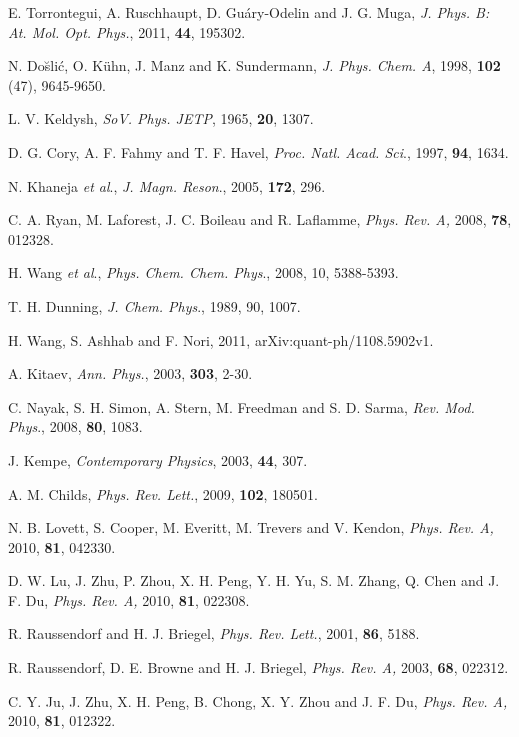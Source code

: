 \documentclass[8.5pt,twoside,twocolumn]{article}
\begin{document}
\begin{thebibliography}{99}
E. Torrontegui, A. Ruschhaupt, D. Gu\'{a}ry-Odelin and J. G. Muga, \emph{J. Phys. B: At. Mol. Opt. Phys.}, 2011, \textbf{44}, 195302.

N. Do\u{s}li\'{c}, O. K\"{u}hn, J. Manz and K. Sundermann, \emph{J. Phys. Chem. A}, 1998, \textbf{102} (47), 9645-9650.

L. V. Keldysh, \emph{SoV. Phys. JETP}, 1965, \textbf{20}, 1307.


D. G. Cory, A. F. Fahmy and T. F. Havel, \emph{Proc. Natl. Acad. Sci}., 1997, \textbf{94}, 1634.

N. Khaneja \emph{et al}., \emph{J. Magn. Reson}., 2005, \textbf{172}, 296.


C. A. Ryan, M. Laforest, J. C. Boileau and R. Laflamme, \emph{Phys. Rev. A,} 2008, \textbf{78}, 012328.

H. Wang \emph{et al}., \emph{Phys. Chem. Chem. Phys}., 2008, 10, 5388-5393.

 T. H. Dunning, \emph{J. Chem. Phys}., 1989, 90, 1007.

 H. Wang, S. Ashhab and F. Nori, 2011, arXiv:quant-ph/1108.5902v1.

A. Kitaev, \emph{Ann. Phys.}, 2003, \textbf{303}, 2-30.

C. Nayak, S. H. Simon, A. Stern, M. Freedman and S. D. Sarma, \emph{Rev. Mod. Phys}., 2008, \textbf{80}, 1083.

J. Kempe, \emph{Contemporary Physics}, 2003, \textbf{44}, 307.

 A. M. Childs, \emph{Phys. Rev. Lett.}, 2009, \textbf{102}, 180501.

N. B. Lovett, S. Cooper, M. Everitt, M. Trevers and V. Kendon, \emph{Phys. Rev. A,} 2010, \textbf{81}, 042330.

D. W. Lu, J. Zhu, P. Zhou, X. H. Peng, Y. H. Yu, S. M. Zhang, Q. Chen and J. F. Du, \emph{Phys. Rev. A,} 2010, \textbf{81}, 022308.

R. Raussendorf and H. J. Briegel, \emph{Phys. Rev. Lett.}, 2001, \textbf{86}, 5188.


R. Raussendorf, D. E. Browne and H. J. Briegel, \emph{Phys. Rev. A,} 2003, \textbf{68}, 022312.

 C. Y. Ju, J. Zhu, X. H. Peng, B. Chong, X. Y. Zhou and J. F. Du, \emph{Phys. Rev. A,} 2010, \textbf{81}, 012322.




\end{thebibliography}
\end{document}

